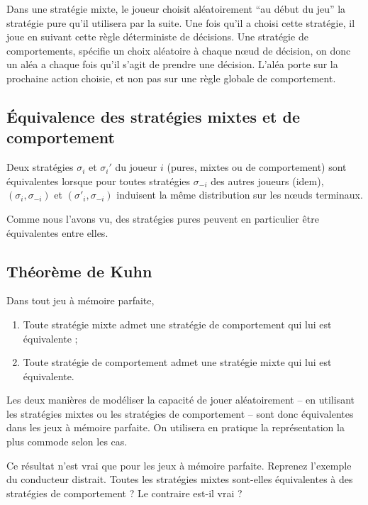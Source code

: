 Dans une stratégie mixte, le joueur choisit aléatoirement ``au
début du jeu'' la stratégie pure qu'il utilisera par la suite. Une
fois qu'il a choisi cette stratégie, il joue en suivant cette
règle déterministe de décisions. Une stratégie de comportements,
spécifie un choix aléatoire à chaque n{\oe}ud de décision, on donc
un aléa a chaque fois qu'il s'agit de prendre une décision. L'aléa
porte sur la prochaine action choisie, et non pas sur une règle
globale de comportement.

\subsection{\'Equivalence des stratégies mixtes et de comportement}

Deux stratégies $\sigma_i$ et $\sigma_i'$ du joueur $i$ (pures,
mixtes ou de comportement) sont équivalentes lorsque pour toutes
stratégies $\sigma_{-i}$ des autres joueurs (idem),
$(\sigma_i,\sigma_{-i})$ et $(\sigma'_i,\sigma_{-i})$ induisent la
m\^eme distribution sur les n{\oe}uds terminaux.

Comme nous l'avons vu, des stratégies pures peuvent en particulier
être équivalentes entre elles.

\subsection{Théorème de Kuhn}

\begin{theoreme}[de Kuhn]
Dans tout jeu à mémoire parfaite,
\begin{enumerate}
\item Toute stratégie mixte admet une stratégie de comportement
qui lui est équivalente ;
\item Toute stratégie de comportement
admet une stratégie mixte qui lui est équivalente.
\end{enumerate}
\end{theoreme}

Les deux manières de modéliser la capacité de jouer aléatoirement
-- en utilisant les stratégies mixtes ou les stratégies de
comportement -- sont donc équivalentes dans les jeux à mémoire
parfaite. On utilisera en pratique la représentation la plus
commode selon les cas.%

Ce résultat n'est vrai que pour les jeux à mémoire parfaite.
Reprenez l'exemple du conducteur distrait. Toutes les stratégies
mixtes sont-elles équivalentes à des stratégies de comportement ?
Le contraire est-il vrai ?

